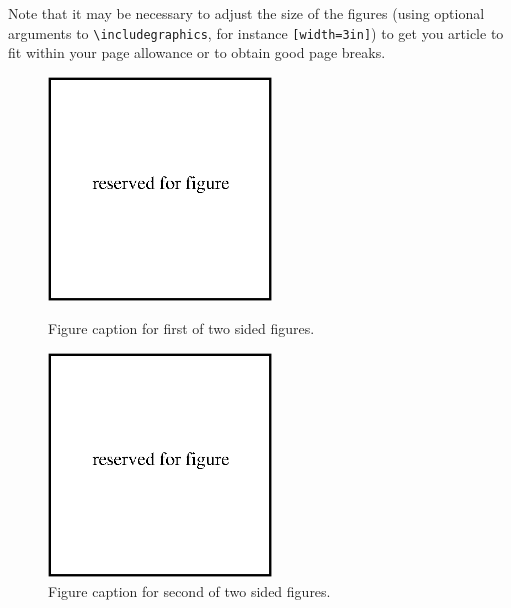 \documentclass[a4paper]{jpconf}
\begin{document}
Note that it may be necessary to adjust the size of the figures (using optional arguments to \verb"\includegraphics", for instance \verb"[width=3in]") to get you article to fit within your page allowance or to obtain good page breaks.

\begin{figure}[h]

\begin{minipage}{14pc}
\includegraphics[width=14pc]{name.eps}
\caption{\label{label}Figure caption for first of two sided figures.}
\end{minipage}

\hspace{2pc}%

\begin{minipage}{14pc}
\includegraphics[width=14pc]{name.eps}
\caption{\label{label}Figure caption for second of two sided figures.}
\end{minipage} 

\end{figure}
\end{document}
